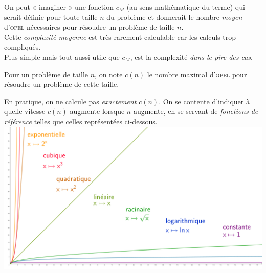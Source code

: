 On peut « imaginer » une fonction $c_M$ (au sens mathématique du terme) qui serait définie pour toute taille $n$ du problème et	donnerait le nombre \textit{moyen}  d'\textsc{opel} nécessaires pour résoudre un problème de taille $n$.\\
Cette \textit{complexité moyenne} est très rarement calculable car les calculs trop compliqués.\\


Plus simple mais tout aussi utile que $c_M$, est la complexité \textit{dans le pire des cas}.

\begin{definition}
Pour un problème de taille $n$, on note $c(n)$ le nombre maximal d'\textsc{opel} pour résoudre un problème de cette taille.
\end{definition}

En pratique, on ne calcule pas \textit{exactement} $c(n)$. On se contente d'indiquer à quelle vitesse $c(n)$ augmente lorsque $n$ augmente, en se servant de \textit{fonctions de référence} telles que celles représentées ci-dessous.\\

\includegraphics[width=\linewidth]{ch-complexite/img/complexite}

